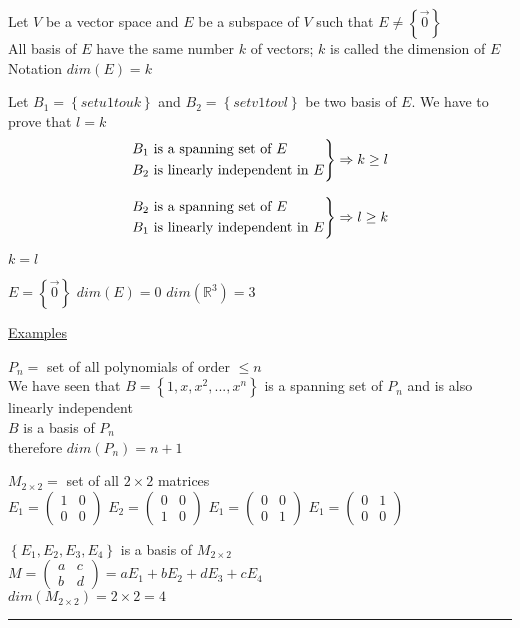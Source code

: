 \documentclass[12pt]{article}
\renewcommand{\v}[1]{\overrightarrow{#1}}
\newcommand\mm[1]{\begin{pmatrix}#1\end{pmatrix}}
\newcommand{\real}[0]{\mathbb{R}}
\newenvironment{proof}{\block[Proof]}{\endblock}
\newenvironment{theorem}{\block[Theorem]}{\endblock}
\newenvironment{remark}{\block[Remark]}{\endblock}
\newenvironment{examples}{\shownto{-,compact}\underline{Examples}\enumerate}{\endenumerate\divider\endshownto}
\newcommand{\bb}[1]{\left\{#1\right\}}
\newcommand{\divider}[0]{\par\textcolor{lightgray}{\rule{\textwidth}{0.1pt}}}
\begin{document}
	\begin{theorem}
		Let $V$ be a vector space and $E$ be a subspace of $V$ such that $E \ne \bb{\v{0}}$ \\
		All basis of $E$ have the same number $k$ of vectors; $k$ is called the dimension of $E$ \\
		Notation \qquad $dim(E) = k$
		
		\begin{proof}
			Let $B_1 = \bb{set u1 to uk}$ and $B_2 = \bb{set v1 to vl}$ be two basis of $E$. We have to prove that $l = k$ \\
			
			\begin{equation*}
			\begin{rcases*}
			B_1 \text{ is a spanning set of } E \\
			B_2 \text{ is linearly independent in } E
			\end{rcases*} \Rightarrow k \ge l
			\end{equation*}
			
			\begin{equation*}
			\begin{rcases*}
			B_2 \text{ is a spanning set of } E \\
			B_1 \text{ is linearly independent in } E
			\end{rcases*} \Rightarrow l \ge k
			\end{equation*}
			
			$k = l$
		\end{proof}
	\end{theorem}
	
	\begin{remark}
		$E = \bb{\v{0}}$ \quad
		$dim(E) = 0$ \quad
		$dim(\real^3) = 3$
	\end{remark}
	
	\begin{examples}
		\item $P_n =$ set of all polynomials of order $\le n$ \\
		We have seen that $B = \bb{1, x, x^2, ..., x^n}$ is a spanning set of $P_n$ and is also linearly independent \\
		
		$B$ is a basis of $P_n$ \\
		therefore $dim(P_n) = n + 1$
		
		\item $M_{2 \times 2} =$ set of all $2 \times 2$ matrices \\
		$E_1 = \mm{1 & 0 \\ 0 & 0}$
		$E_2 = \mm{0 & 0 \\ 1 & 0}$
		$E_1 = \mm{0 & 0 \\ 0 & 1}$
		$E_1 = \mm{0 & 1 \\ 0 & 0}$
		
		$\bb{E_1, E_2, E_3, E_4}$ is a basis of $M_{2 \times 2}$ \\
		$M = \mm{a & c \\ b & d} = aE_1 + bE_2 + dE_3 + cE_4$ \\
		$dim(M_{2 \times 2}) = 2 \times 2 = 4$
	\end{examples}
	
\end{document}
